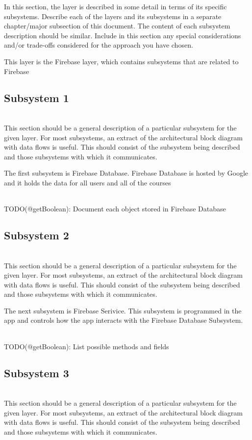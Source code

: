 In this section, the layer is described in some detail in terms of its specific subsystems. Describe each of the layers and its subsystems in a separate chapter/major subsection of this document. The content of each subsystem description should be similar. Include in this section any special considerations and/or trade-offs considered for the approach you have chosen.

This layer is the Firebase layer, which contains subsystems that are related to Firebase

\subsection{Subsystem 1}
\\ This section should be a general description of a particular subsystem for the given layer. For most subsystems, an extract of the architectural block diagram with data flows is useful. This should consist of the subsystem being described and those subsystems with which it communicates.

The first subsystem is Firebase Database. Firebase Database is hosted by Google and it holds the data for all users and all of the courses

\\ TODO(@getBoolean): Document each object stored in Firebase Database

\subsection{Subsystem 2}
\\ This section should be a general description of a particular subsystem for the given layer. For most subsystems, an extract of the architectural block diagram with data flows is useful. This should consist of the subsystem being described and those subsystems with which it communicates.

The next subsystem is Firebase Serivice. This subsystem is programmed in the app and controls how the app interacts with the Firebase Database Subsystem.

\\ TODO(@getBoolean): List possible methods and fields

\subsection{Subsystem 3}
\\ This section should be a general description of a particular subsystem for the given layer. For most subsystems, an extract of the architectural block diagram with data flows is useful. This should consist of the subsystem being described and those subsystems with which it communicates.


